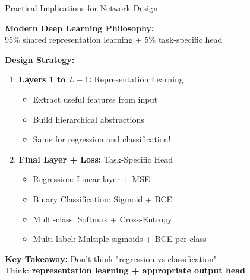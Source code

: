 \documentclass[xcolor=svgnames, 8pt, handout, standalone]{beamer}
\newcommand{\1}{\mathbf{1}}
\begin{document}
\begin{frame}{Practical Implications for Network Design}
\begin{tcolorbox}[colback=lightyellow, colframe=energyorange, boxrule=2pt]
\centering
\textbf{Modern Deep Learning Philosophy:}\\
95\% shared representation learning + 5\% task-specific head
\end{tcolorbox}

\vspace{0.5em}
\textbf{Design Strategy:}
\begin{enumerate}
\item \textbf{Layers 1 to $L-1$:} Representation Learning
\begin{itemize}
\item Extract useful features from input
\item Build hierarchical abstractions
\item \textcolor{deepblue}{Same for regression and classification!}
\end{itemize}

\vspace{0.3em}
\item \textbf{Final Layer + Loss:} Task-Specific Head
\begin{itemize}
\item Regression: Linear layer + MSE
\item Binary Classification: Sigmoid + BCE
\item Multi-class: Softmax + Cross-Entropy
\item Multi-label: Multiple sigmoids + BCE per class
\end{itemize}
\end{enumerate}

\pause
\vspace{0.3em}
\begin{tcolorbox}[colback=lightblue, colframe=deepblue, boxrule=1pt]
\textbf{Key Takeaway:} Don't think "regression vs classification"\\
Think: \textbf{representation learning + appropriate output head}
\end{tcolorbox}
\end{frame}
\end{document}
